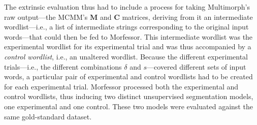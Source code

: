 {%

The extrinsic evaluation thus had to include a process for taking Multimorph's raw output---the MCMM's
$\textbf{M}$ and $\textbf{C}$ matrices, deriving from it an intermediate wordlist---i.e.,
a list of intermediate strings corresponding to the original input words---that could %
then be fed to Morfessor. 
This intermediate wordlist was the experimental wordlist for its experimental trial
and was thus accompanied by a \emph{control wordlist}, i.e., an unaltered wordlist.
Because the different experimental trials---i.e., 
the different combinations $\delta$ and $s$---covered
different sets of input words, a particular pair of experimental and control wordlists had to be created for each
experimental trial.
Morfessor processed both the experimental and control wordlists, 
thus inducing two distinct unsupervised segmentation 
models, one experimental and one control. 
These two models were evaluated
against the same gold-standard dataset. 


}
